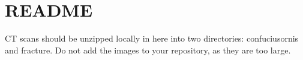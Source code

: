 \chapter{README}
\hypertarget{md__scans_2_r_e_a_d_m_e}{}\label{md__scans_2_r_e_a_d_m_e}
CT scans should be unzipped locally in here into two directories\+: confuciusornis and fracture. Do not add the images to your repository, as they are too large. 